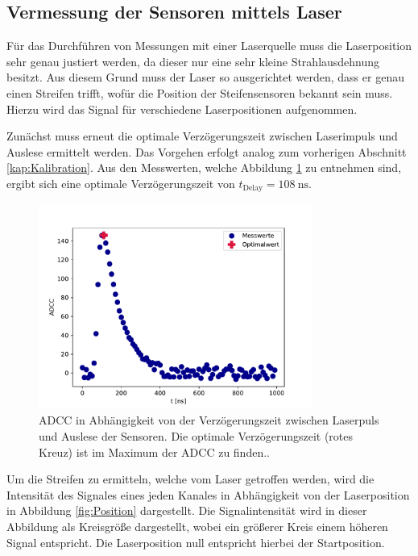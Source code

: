 \subsection{Vermessung der Sensoren mittels Laser}
\label{kap:Vermessung}
Für das Durchführen von Messungen mit einer Laserquelle muss die Laserposition sehr genau justiert werden, da dieser nur eine sehr kleine Strahlausdehnung besitzt. Aus diesem Grund muss der Laser so ausgerichtet werden, dass er genau einen Streifen trifft, wofür die Position der Steifensensoren bekannt sein muss. Hierzu wird das Signal für verschiedene Laserpositionen aufgenommen.

Zunächst muss erneut die optimale Verzögerungszeit zwischen Laserimpuls und Auslese ermittelt werden. Das Vorgehen erfolgt analog zum vorherigen Abschnitt \ref{kap:Kalibration}. Aus den Messwerten, welche Abbildung \ref{fig:Delay Laser} zu entnehmen sind, ergibt sich eine optimale Verzögerungszeit von $t_{\mathrm{Delay}}=\SI{108}{\nano\second}$.
\begin{figure}
  \centering
  \includegraphics[width=0.8\textwidth]{plots/Delay_Laser.pdf}
  \caption{ADCC in Abhängigkeit von der Verzögerungszeit zwischen Laserpuls und Auslese der Sensoren. Die optimale Verzögerungszeit (rotes Kreuz) ist im Maximum der ADCC zu finden..}
  \label{fig:Delay Laser}
\end{figure}
\FloatBarrier
Um die Streifen zu ermitteln, welche vom Laser getroffen werden, wird die Intensität des Signales eines jeden Kanales in Abhängigkeit von der Laserposition in Abbildung \ref{fig:Position} dargestellt. Die Signalintensität wird in dieser Abbildung als Kreisgröße dargestellt, wobei ein größerer Kreis einem höheren Signal entspricht. Die Laserposition null entspricht hierbei der Startposition.

